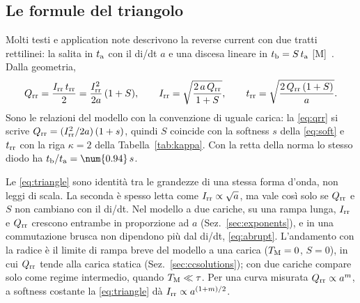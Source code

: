\documentclass[10pt,a4paper]{scrartcl}
\let\newcommand\pdvaluedefine
\newcommand{\Irr}{I_\mathrm{rr}}
\newcommand{\Qrr}{Q_\mathrm{rr}}
\newcommand{\trr}{t_\mathrm{rr}}
\newcommand{\ta}{t_\mathrm{a}}
\newcommand{\tb}{t_\mathrm{b}}
\newcommand{\TM}{T_\mathrm{M}}
\begin{document}
\subsection{Le formule del triangolo}
\label{sec:triangle}
Molti testi e application note descrivono la reverse current con due tratti rettilinei: la salita in $\ta$ con il di/dt $a$ e una discesa lineare in $\tb = S\,\ta$ [M]~\cite{mohan}. Dalla geometria,
\begin{equation}
\Qrr = \frac{\Irr\,\trr}{2} = \frac{\Irr^2}{2a}\,(1+S) , \qquad \Irr = \sqrt{\frac{2\,a\,\Qrr}{1+S}} , \qquad \trr = \sqrt{\frac{2\,\Qrr\,(1+S)}{a}} .
\label{eq:triangle}
\end{equation}
Sono le relazioni del modello con la convenzione di uguale carica: la \eqref{eq:qrr} si scrive $\Qrr = (\Irr^2/2a)\,(1+s)$, quindi $S$ coincide con la softness $s$ della \eqref{eq:soft} e $\trr$ con la riga $\kappa = 2$ della Tabella~\ref{tab:kappa}. Con la retta della norma lo stesso diodo ha $\tb/\ta = \num{\lmKLineHalf}\,s$.

Le \eqref{eq:triangle} sono identità tra le grandezze di una stessa forma d'onda, non leggi di scala. La seconda è spesso letta come $\Irr \propto \sqrt{a}$, ma vale così solo se $\Qrr$ e $S$ non cambiano con il di/dt. Nel modello a due cariche, su una rampa lunga, $\Irr$ e $\Qrr$ crescono entrambe in proporzione ad $a$ (Sez.~\ref{sec:exponents}), e in una commutazione brusca non dipendono più dal di/dt, \eqref{eq:abrupt}. L'andamento con la radice è il limite di rampa breve del modello a una carica ($\TM = 0$, $S = 0$), in cui $\Qrr$ tende alla carica statica (Sez.~\ref{sec:ccsolutions}); con due cariche compare solo come regime intermedio, quando $\TM \ll \tau$. Per una curva misurata $\Qrr \propto a^{m}$, a softness costante la \eqref{eq:triangle} dà $\Irr \propto a^{(1+m)/2}$.
\end{document}
